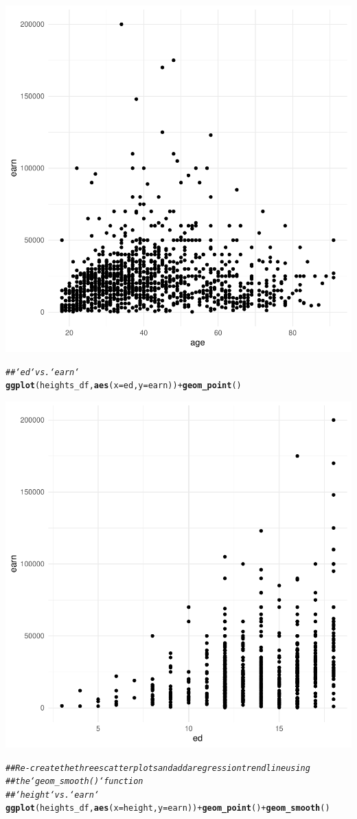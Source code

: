 \documentclass{article}\usepackage[]{graphicx}\usepackage[]{xcolor}
\makeatletter
\newcommand{\hlcom}[1]{\textcolor[rgb]{0.678,0.584,0.686}{\textit{#1}}}%
\newcommand{\hlopt}[1]{\textcolor[rgb]{0,0,0}{#1}}%
\newcommand{\hlstd}[1]{\textcolor[rgb]{0.345,0.345,0.345}{#1}}%
\newcommand{\hlkwc}[1]{\textcolor[rgb]{0.333,0.667,0.333}{#1}}%
\newcommand{\hlkwd}[1]{\textcolor[rgb]{0.737,0.353,0.396}{\textbf{#1}}}%
\newenvironment{kframe}{%
 \def\at@end@of@kframe{}%
 \ifinner\ifhmode%
  \def\at@end@of@kframe{\end{minipage}}%
  \begin{minipage}{\columnwidth}%
 \fi\fi%
 \def\FrameCommand##1{\hskip\@totalleftmargin \hskip-\fboxsep
 \colorbox{shadecolor}{##1}\hskip-\fboxsep
     \hskip-\linewidth \hskip-\@totalleftmargin \hskip\columnwidth}%
 \MakeFramed {\advance\hsize-\width
   \@totalleftmargin\z@ \linewidth\hsize
   \@setminipage}}%
 {\par\unskip\endMakeFramed%
 \at@end@of@kframe}
\newenvironment{knitrout}{}{} %
\makeatother
\begin{document}
\begin{knitrout}
{\centering \includegraphics[width=.6\linewidth]{figure/assignment-03-ChattapadhyayKausik-Rnwauto-report-2} 

}


\begin{kframe}\begin{alltt}
\hlcom{## `ed` vs. `earn`}
\hlkwd{ggplot}\hlstd{(heights_df,} \hlkwd{aes}\hlstd{(}\hlkwc{x}\hlstd{=ed,} \hlkwc{y}\hlstd{=earn))} \hlopt{+} \hlkwd{geom_point}\hlstd{()}
\end{alltt}
\end{kframe}

{\centering \includegraphics[width=.6\linewidth]{figure/assignment-03-ChattapadhyayKausik-Rnwauto-report-3} 

}


\begin{kframe}\begin{alltt}
\hlcom{## Re-create the three scatterplots and add a regression trend line using}
\hlcom{## the `geom_smooth()` function}
\hlcom{## `height` vs. `earn`}
\hlkwd{ggplot}\hlstd{(heights_df,} \hlkwd{aes}\hlstd{(}\hlkwc{x}\hlstd{=height,} \hlkwc{y}\hlstd{=earn))} \hlopt{+} \hlkwd{geom_point}\hlstd{()} \hlopt{+} \hlkwd{geom_smooth}\hlstd{()}
\end{alltt}



\end{kframe}
\end{knitrout}
\end{document}
